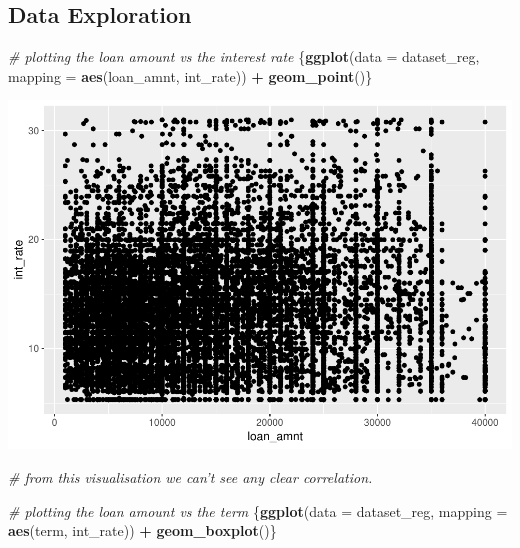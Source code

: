 \documentclass[]{article}
\newenvironment{Shaded}{\begin{snugshade}}{\end{snugshade}}
\newcommand{\CommentTok}[1]{\textcolor[rgb]{0.56,0.35,0.01}{\textit{#1}}}
\newcommand{\DataTypeTok}[1]{\textcolor[rgb]{0.13,0.29,0.53}{#1}}
\newcommand{\KeywordTok}[1]{\textcolor[rgb]{0.13,0.29,0.53}{\textbf{#1}}}
\newcommand{\NormalTok}[1]{#1}
\newcommand{\OperatorTok}[1]{\textcolor[rgb]{0.81,0.36,0.00}{\textbf{#1}}}
\newcommand{\StringTok}[1]{\textcolor[rgb]{0.31,0.60,0.02}{#1}}
\begin{document}
\hypertarget{data-exploration}{%
\subsection{Data Exploration}\label{data-exploration}}

\begin{Shaded}
\begin{Highlighting}[]
\CommentTok{# plotting the loan amount vs the interest rate}
\NormalTok{\{}\KeywordTok{ggplot}\NormalTok{(}\DataTypeTok{data =}\NormalTok{ dataset_reg, }\DataTypeTok{mapping =} \KeywordTok{aes}\NormalTok{(loan_amnt, int_rate)) }\OperatorTok{+}
\StringTok{  }\KeywordTok{geom_point}\NormalTok{()\}}
\end{Highlighting}
\end{Shaded}

\includegraphics{Machine_learning_Group_7_files/figure-latex/Data Exploration - interest rate vs loan amount-1.pdf}

\begin{Shaded}
\begin{Highlighting}[]
\CommentTok{# from this visualisation we can't see any clear correlation.}
\end{Highlighting}
\end{Shaded}

\begin{Shaded}
\begin{Highlighting}[]
\CommentTok{# plotting the loan amount vs the term}
\NormalTok{\{}\KeywordTok{ggplot}\NormalTok{(}\DataTypeTok{data =}\NormalTok{ dataset_reg, }\DataTypeTok{mapping =} \KeywordTok{aes}\NormalTok{(term, int_rate)) }\OperatorTok{+}
\StringTok{  }\KeywordTok{geom_boxplot}\NormalTok{()\}}
\end{Highlighting}
\end{Shaded}
\end{document}
